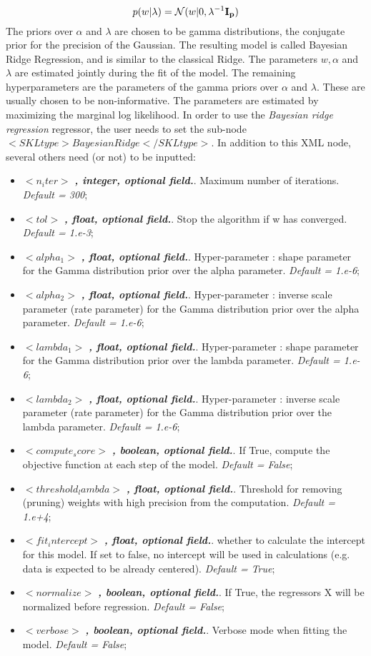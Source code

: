 \begin{equation}
p(w|\lambda) =\mathcal{N}(w|0,\lambda^{-1}\bold{I_{p}})
\end{equation}
The priors over $\alpha$ and $\lambda$ are chosen to be gamma distributions, the conjugate prior for the precision of the Gaussian.
The resulting model is called Bayesian Ridge Regression, and is similar to the classical Ridge. The parameters $w, \alpha$ and $\lambda$ are estimated jointly during the fit of the model. The remaining hyperparameters are the parameters of the gamma priors over $\alpha$ and $\lambda$. These are usually chosen to be non-informative. The parameters are estimated by maximizing the marginal log likelihood.
In order to use the  \textit{Bayesian ridge regression} regressor, the user needs to set the sub-node $<SKLtype>BayesianRidge</SKLtype>$.  In addition to this XML node, several others need (or not) to be inputted:
\begin{itemize}
\item $<n_iter>$ \textbf{\textit{, integer, optional field.}}.  Maximum number of iterations. \textit{Default = 300};
\item $<tol>$ \textbf{\textit{, float, optional field.}}.  Stop the algorithm if w has converged. \textit{Default = 1.e-3};
\item $<alpha_1>$ \textbf{\textit{, float, optional field.}}.  Hyper-parameter : shape parameter for the Gamma distribution prior over the alpha parameter. \textit{Default =  1.e-6};
\item $<alpha_2>$ \textbf{\textit{, float, optional field.}}.  Hyper-parameter : inverse scale parameter (rate parameter) for the Gamma distribution prior over the alpha parameter. \textit{Default =  1.e-6};
\item $<lambda_1>$ \textbf{\textit{, float, optional field.}}.  Hyper-parameter : shape parameter for the Gamma distribution prior over the lambda parameter. \textit{Default =  1.e-6};
\item $<lambda_2>$ \textbf{\textit{, float, optional field.}}.  Hyper-parameter : inverse scale parameter (rate parameter) for the Gamma distribution prior over the lambda parameter. \textit{Default =  1.e-6};
\item $<compute_score>$ \textbf{\textit{, boolean, optional field.}}.  If True, compute the objective function at each step of the model. \textit{Default =  False};
\item $<threshold_lambda>$ \textbf{\textit{, float, optional field.}}.  Threshold for removing (pruning) weights with high precision from the computation. \textit{Default =  1.e+4};
\item $<fit_intercept>$ \textbf{\textit{, float, optional field.}}.  whether to calculate the intercept for this model. If set to false, no intercept will be used in calculations (e.g. data is expected to be already centered). \textit{Default =  True};
\item $<normalize>$ \textbf{\textit{, boolean, optional field.}}.  If True, the regressors X will be normalized before regression. \textit{Default =  False};
\item $<verbose>$ \textbf{\textit{, boolean, optional field.}}.  Verbose mode when fitting the model. \textit{Default =  False};
\end{itemize}
